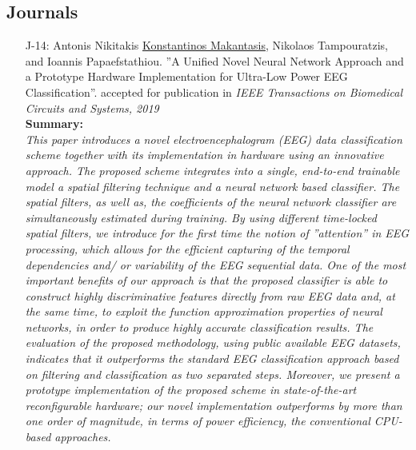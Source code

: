 \documentclass[a4paper,10pt]{article}
\begin{document}
\subsection*{Journals}
\begin{itemize}
	\item [J-14:]Antonis Nikitakis \underline{Konstantinos Makantasis}, Nikolaos Tampouratzis, and Ioannis Papaefstathiou. ''A Unified Novel Neural Network Approach and a Prototype Hardware Implementation for Ultra-Low Power EEG Classification''. accepted for publication in \textit{IEEE Transactions on Biomedical Circuits and Systems, 2019}\\
	\textbf{Summary:}\\
	\textit{This paper introduces a novel electroencephalogram (EEG) data classification scheme together with its implementation in hardware using an innovative approach. The proposed scheme integrates into a single, end-to-end trainable model a spatial filtering technique and a neural network based classifier. The spatial filters, as well as, the coefficients of the neural network classifier are simultaneously estimated during training. By using different  time-locked spatial filters, we introduce for the first time  the notion of ''attention'' in EEG processing, which allows for the efficient capturing of the temporal dependencies and/ or variability of the EEG sequential data. One of the most important benefits of our approach is that the proposed classifier is able to construct highly discriminative features directly from raw EEG data and, at the same time, to exploit the function approximation properties of neural networks, in order to produce highly accurate classification results. The evaluation of the proposed methodology, using public available EEG datasets, indicates that it outperforms the standard EEG classification approach based on filtering and classification as two separated steps. Moreover, we present a prototype implementation of the proposed scheme in state-of-the-art reconfigurable hardware; our novel implementation outperforms by more than one order of magnitude, in terms of power efficiency, the conventional CPU-based approaches.}	
	

\end{itemize}
\end{document}
